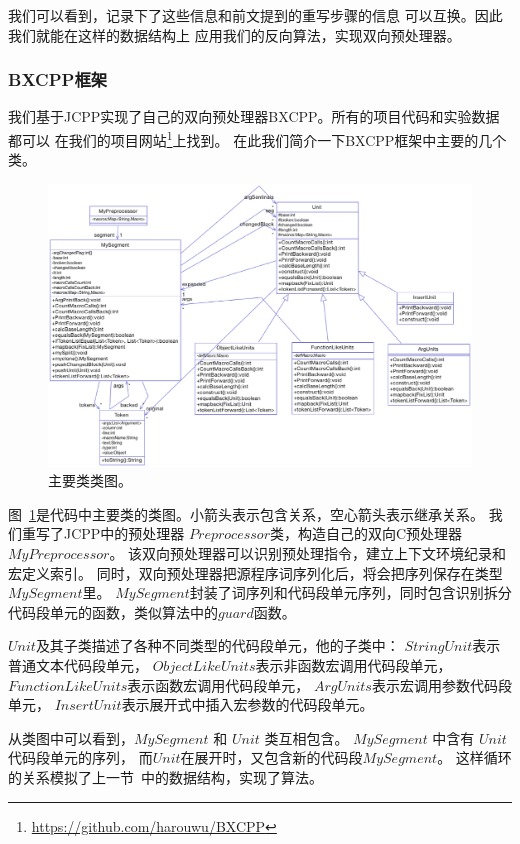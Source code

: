 我们可以看到，记录下了这些信息和前文提到的重写步骤的信息
可以互换。因此我们就能在这样的数据结构上
应用我们的反向算法，实现双向预处理器。


\subsubsection{BXCPP框架}
我们基于JCPP实现了自己的双向预处理器BXCPP。所有的项目代码和实验数据都可以
在我们的项目网站\footnote{\url{https://github.com/harouwu/BXCPP}}上找到。
在此我们简介一下BXCPP框架中主要的几个类。
\begin{figure}
\centering
\includegraphics[width=14cm]{pics/class.eps}
\caption{主要类类图。\label{pic:classd}}
\end{figure}


图~\ref{pic:classd}是代码中主要类的类图。小箭头表示包含关系，空心箭头表示继承关系。
我们重写了JCPP中的预处理器 $Preprocessor$类，构造自己的双向C预处理器 $MyPreprocessor$。
该双向预处理器可以识别预处理指令，建立上下文环境纪录和宏定义索引。
同时，双向预处理器把源程序词序列化后，将会把序列保存在类型 $MySegment$里。
$MySegment$封装了词序列和代码段单元序列，同时包含识别拆分代码段单元的函数，类似算法中的$guard$函数。


$Unit$及其子类描述了各种不同类型的代码段单元，他的子类中：
$StringUnit$表示普通文本代码段单元，
$ObjectLikeUnits$表示非函数宏调用代码段单元，
$FunctionLikeUnits$表示函数宏调用代码段单元，
$ArgUnits$表示宏调用参数代码段单元，
$InsertUnit$表示展开式中插入宏参数的代码段单元。

从类图中可以看到，$MySegment$ 和 $Unit$ 类互相包含。
$MySegment$ 中含有 $Unit$ 代码段单元的序列，
而$Unit$在展开时，又包含新的代码段$MySegment$。
这样循环的关系模拟了上一节~中的数据结构，实现了算法。

